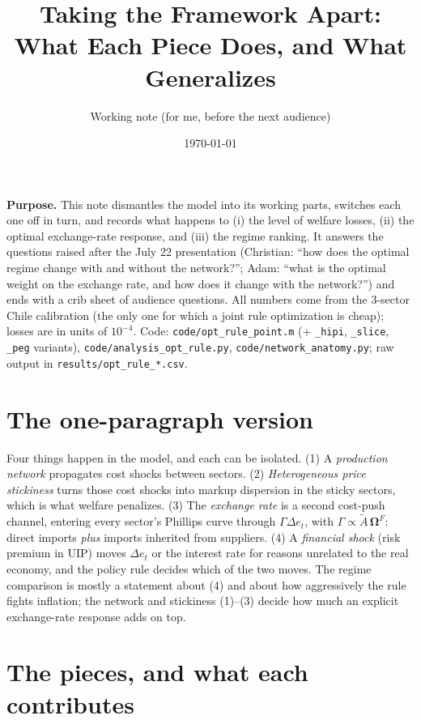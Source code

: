 \documentclass[11pt]{article}
\title{\Large Taking the Framework Apart:\\ What Each Piece Does, and What Generalizes}
\author{Working note (for me, before the next audience)}
\date{\today}
\begin{document}
\maketitle

\noindent\textbf{Purpose.} This note dismantles the model into its working parts, switches each one off in turn,
and records what happens to (i) the level of welfare losses, (ii) the optimal exchange-rate response, and (iii)
the regime ranking. It answers the questions raised after the July 22 presentation (Christian: ``how does the
optimal regime change with and without the network?''; Adam: ``what is the optimal weight on the exchange rate, and
how does it change with the network?'') and ends with a crib sheet of audience questions. All numbers come from
the 3-sector Chile calibration (the only one for which a joint rule optimization is cheap); losses are in units of
$10^{-4}$. Code: \texttt{code/opt\_rule\_point.m} (+ \texttt{\_hipi}, \texttt{\_slice}, \texttt{\_peg} variants),
\texttt{code/analysis\_opt\_rule.py}, \texttt{code/network\_anatomy.py}; raw output in \texttt{results/opt\_rule\_*.csv}.

\section{The one-paragraph version}

Four things happen in the model, and each can be isolated. (1) A \emph{production network} propagates cost shocks
between sectors. (2) \emph{Heterogeneous price stickiness} turns those cost shocks into markup dispersion in the
sticky sectors, which is what welfare penalizes. (3) The \emph{exchange rate} is a second cost-push channel,
entering every sector's Phillips curve through $\Gamma\Delta e_t$, with $\Gamma\propto\tilde A\,\bm\Omega^F$: direct
imports \emph{plus} imports inherited from suppliers. (4) A \emph{financial shock} (risk premium in UIP) moves $\Delta e_t$
or the interest rate for reasons unrelated to the real economy, and the policy rule decides which of the two moves.
The regime comparison is mostly a statement about (4) and about how aggressively the rule fights inflation; the
network and stickiness (1)--(3) decide how much an explicit exchange-rate response adds on top.

\section{The pieces, and what each contributes}
\end{document}
